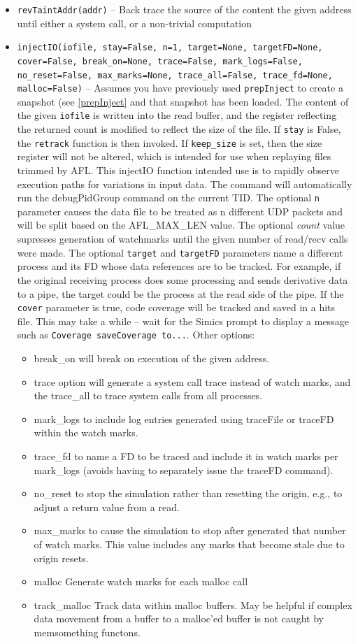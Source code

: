 \documentclass[titlepage]{article}
\begin{document}
\begin{itemize}
\item {\tt revTaintAddr(addr)} -- Back trace the source of the content the given address until either a system call, or a non-trivial computation

\item {\tt injectIO(iofile, stay=False, n=1, target=None, targetFD=None, cover=False, break\_on=None, trace=False, mark\_logs=False, no\_reset=False, max\_marks=None, trace\_all=False, trace\_fd=None, malloc=False)} -- Assumes you have previously used {\tt prepInject}
to create a snapshot (see \ref{prepInject} and that snapshot has been loaded.
The content of the given {\tt iofile} is written into the read buffer, and the register reflecting 
the returned count is modified to reflect the size of the file.  If {\tt stay} is False, the {\tt retrack} function is then invoked. If {\tt keep\_size} is
set, then the size register will not be altered, which is intended for use when replaying files trimmed by AFL.
This injectIO function intended use is to rapidly observe execution paths for variations in input data. The command will automatically
run the debugPidGroup command on the current TID. The optional {\tt n} parameter causes the data file to be treated as n different UDP packets and will be split
based on the AFL\_MAX\_LEN value.  The optional \textit{count} value supresses generation of watchmarks until the given number of read/recv calls were made.
The optional {\tt target} and {\tt targetFD} parameters name a different process and its FD whose data references are to be tracked.  For example,
if the original receiving process does some processing and sends derivative data to a pipe, the target could be the process at the read side
of the pipe.  If the {\tt cover} parameter is true, code coverage will be tracked and saved in a hits file.  This may take a while -- wait for the
Simics prompt to display a message such as {\tt Coverage saveCoverage to...}.
Other options:
\begin{itemize}
\item break\_on will break on execution of the given address. 
\item trace option will generate a system call trace instead of watch marks, and the trace\_all to trace system calls from all processes. 
\item mark\_logs to include log entries generated using traceFile or traceFD within the watch marks.
\item trace\_fd to name a FD to be traced and include it in watch marks per mark\_logs (avoids having to separately issue the traceFD command).
\item no\_reset to stop the simulation rather than resetting the origin, e.g., to adjust a return value from a read.
\item max\_marks to cause the simulation to stop after generated that number of watch marks.  This value includes any marks that become stale due to origin resets.
\item malloc Generate watch marks for each malloc call
\item track\_malloc Track data within malloc buffers.  May be helpful if complex data movement from a buffer to a malloc'ed buffer is not caught by memsomething functons.


\end{itemize}
\end{itemize}
\end{document}
